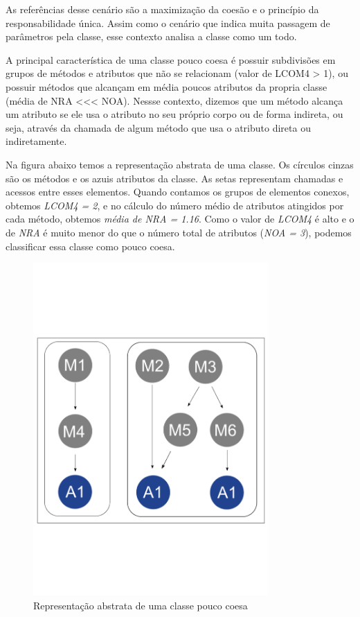 	As referências desse cenário são a maximização da coesão e o princípio da responsabilidade única. Assim como o cenário que indica muita passagem de parâmetros pela classe, esse contexto analisa a classe como um todo.
	
	A principal característica de uma classe pouco coesa é possuir subdivisões em grupos de métodos e atributos que não se relacionam (valor de LCOM4 > 1), ou possuir métodos que alcançam em média poucos atributos da propria classe (média de NRA <<< NOA). Nessse contexto, dizemos que um método alcança um atributo se ele usa o atributo no seu próprio corpo ou de forma indireta, ou seja, através da chamada de algum método que usa o atributo direta ou indiretamente.
	   
	Na figura abaixo temos a representação abstrata de uma classe. Os círculos cinzas são os métodos e os azuis atributos da classe. As setas representam chamadas e acessos entre esses elementos. Quando contamos os grupos de elementos conexos, obtemos \textit{LCOM4 = 2}, e no cálculo do número médio de atributos atingidos por cada método, obtemos \textit{média de NRA = 1.16}. Como o valor de \textit{LCOM4} é alto e o de \textit{NRA} é muito menor do que o número total de atributos (\textit{NOA = 3}), podemos classificar essa classe como pouco coesa.
		
	\begin{figure}[htb]
		\centering
		\includegraphics[trim = 0mm 50mm 0mm 60mm, clip, width=0.8\textwidth]{codigos/exemplos_para_os_cenarios/classe_pouco_coesa.png}
		\caption{Representação abstrata de uma classe pouco coesa}
		\label{classe_pouco_coesa}
	\end{figure}
	
